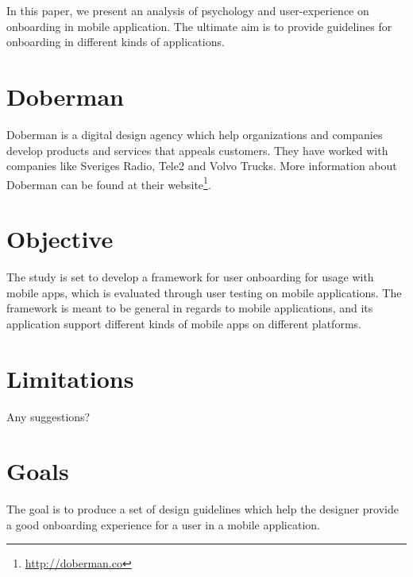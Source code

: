 In this paper, we present an analysis of psychology and user-experience on onboarding in mobile application. The ultimate aim is to provide guidelines for onboarding in different kinds of applications.

\section{Doberman}
Doberman is a digital design agency which help organizations and companies develop products and services that appeals customers. They have worked with companies like Sveriges Radio, Tele2 and Volvo Trucks. More information about Doberman can be found at their website\footnote{\url{http://doberman.co}}.

\section{Objective}
The study is set to develop a framework for user onboarding for usage with mobile apps, which is evaluated through user testing on mobile applications. The framework is meant to be general in regards to mobile applications, and its application support different kinds of mobile apps on different platforms.

\section{Limitations}
Any suggestions?

\section{Goals}
The goal is to produce a set of design guidelines which help the designer provide a good onboarding experience for a user in a mobile application.
